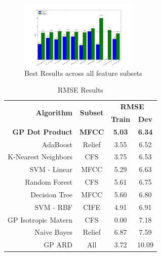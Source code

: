 \documentclass{article}
\begin{document}
	\begin{figure}[h]
 		\begin{center}
		\includegraphics[width=0.5\textwidth]{results_best} 
  		\end{center}
  		\caption{Best Results across all feature subsets}
  		\label{results_best}
 	\end{figure}

	\begin{table}[h!]
		\begin{center}
			\begin{tabular}{ | r | c | c | c | }
			\hline
			\multirow{2}{*}{\bfseries Algorithm}	& \multirow{2}{*}{\bfseries Subset}	& \multicolumn{2}{c|}{\bfseries RMSE} \\\cline{3-4}
									&						& \bfseries Train 	& \bfseries Dev \\ \hline
			\bfseries GP Dot Product  	& \bfseries MFCC  & \bfseries 5.03 & \bfseries 6.34 \\ \hline
			AdaBoost              				& Relief					& 3.55 		& 6.52 \\ \hline
			K-Nearest Neighbors   			& CFS 					& 3.75 		& 6.53 \\ \hline
			SVM - Linear          				& MFCC  					& 5.29 		& 6.63 \\ \hline
			Random Forest         			& CFS   					& 5.61 		& 6.75 \\ \hline
			Decision Tree         				& MFCC  					& 5.60 		& 6.80 \\ \hline
			SVM - RBF             				& CIFE  					& 4.91 		& 6.91 \\ \hline
			GP Isotropic Matern   			& CFS   					& 0.00 		& 7.18 \\ \hline 
			Naive Bayes           				& Relief					& 6.87 		& 7.59 \\ \hline
			GP ARD                				& All   						& 3.72 		& 10.09 \\ \hline

			\end{tabular}
		\end{center}
		\caption{RMSE Results}
		\label{rmse_results}
	\end{table}
	
\end{document}
